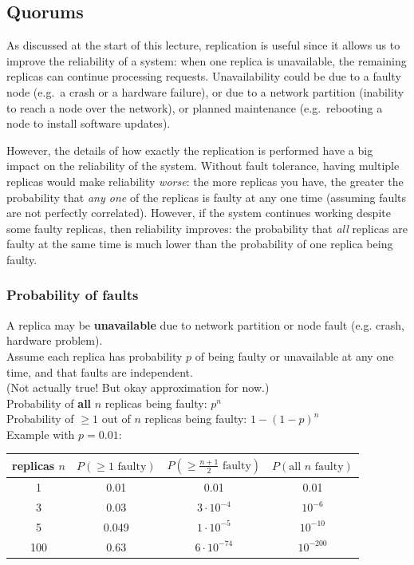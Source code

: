 \subsection{Quorums}\label{sec:quorums}

As discussed at the start of this lecture, replication is useful since it allows us to improve the reliability of a system: when one replica is unavailable, the remaining replicas can continue processing requests.
Unavailability could be due to a faulty node (e.g.\ a crash or a hardware failure), or due to a network partition (inability to reach a node over the network), or planned maintenance (e.g.\ rebooting a node to install software updates).

However, the details of how exactly the replication is performed have a big impact on the reliability of the system.
Without fault tolerance, having multiple replicas would make reliability \emph{worse}: the more replicas you have, the greater the probability that \emph{any one} of the replicas is faulty at any one time (assuming faults are not perfectly correlated).
However, if the system continues working despite some faulty replicas, then reliability improves: the probability that \emph{all} replicas are faulty at the same time is much lower than the probability of one replica being faulty.

\begin{frame}
    \label{s:fault-probability}
    \frametitle{Probability of faults}
    A replica may be \textbf{unavailable} due to network partition or node fault (e.g. crash, hardware problem).\\[1em]\pause
    Assume each replica has probability $p$ of being faulty or unavailable at any one time, and that faults are independent.\\
    {\footnotesize (Not actually true! But okay approximation for now.)}\\[1em]\pause
    Probability of \textbf{all} $n$ replicas being faulty: $p^n$\\
    Probability of $\ge 1$ out of $n$ replicas being faulty: $1-(1-p)^n$\\[1em]\pause
    Example with $p=0.01$:\\[0.5em]
    \begin{tabular}{c|c|c|c}
        \hline
        replicas $n$ & $P(\ge 1 \text{ faulty})$ & $P(\ge \frac{n+1}{2}\text{ faulty})$ & $P(\text{all } n \text{ faulty})$ \\\hline
        1 & 0.01 & 0.01 & 0.01 \\
        3 & 0.03 & $3 \cdot 10^{-4}$ & $10^{-6}$ \\
        5 & 0.049 & $1 \cdot 10^{-5}$ & $10^{-10}$ \\
        100 & 0.63 & $6 \cdot 10^{-74}$ & $10^{-200}$ \\\hline
    \end{tabular}
\end{frame}
\label{l:fault-probability}

